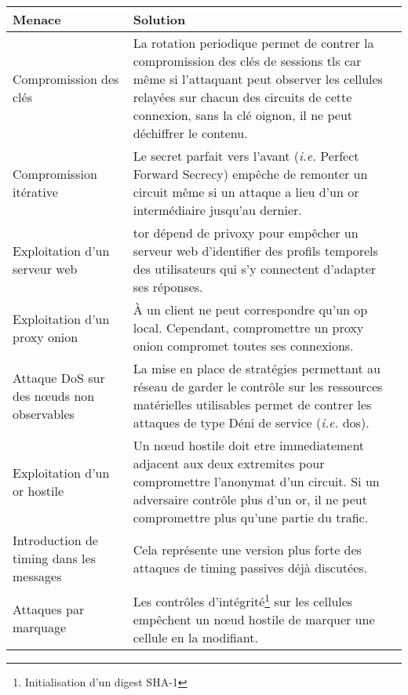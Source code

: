 \begin{table}[htpb]
    \centering
    \begin{tabularx}{\textwidth}{
        >{\raggedright\arraybackslash}p{4.5cm}
        >{\raggedright\arraybackslash}X}
    \toprule
    \rowcolor[HTML]{EFEFEF}
    \textbf{Menace}                                         & \textbf{Solution} \\
    \midrule
    Compromission des clés                                  & La rotation periodique permet de contrer la compromission des clés de sessions \acrshort{tls} car même si l'attaquant peut observer les cellules relayées sur chacun des circuits de cette connexion, sans la clé oignon, il ne peut déchiffrer le contenu. \\ 
    \midrule
    Compromission itérative                                 & Le secret parfait vers l'avant (\textit{i.e.} Perfect Forward Secrecy) empêche de remonter un circuit même si un attaque a lieu d'un \acrshort{or} intermédiaire jusqu'au dernier. \\ 
    \midrule
    Exploitation d'un serveur web                           & \acrshort{tor} dépend de \gls{privoxy} pour empêcher un serveur web d'identifier des profils temporels des utilisateurs qui s'y connectent d'adapter ses réponses. \\
    \midrule
    Exploitation d'un proxy onion                           & À un client ne peut correspondre qu'un \acrshort{op} local. Cependant, compromettre un proxy onion compromet toutes ses connexions. \\ 
    \midrule
    Attaque DoS sur des nœuds non observables               & La mise en place de stratégies permettant au réseau de garder le contrôle sur les ressources matérielles utilisables permet de contrer les attaques de type Déni de service (\textit{i.e.} \acrfull{dos}). \\
    \midrule
    Exploitation d'un \acrshort{or} hostile                 & Un nœud hostile doit etre immediatement adjacent aux deux extremites pour compromettre l'anonymat d'un circuit. Si un adversaire contrôle plus d'un \acrshort{or}, il ne peut compromettre plus qu'une partie du trafic. \\ 
    \midrule
    Introduction de timing dans les messages                & Cela représente une version plus forte des attaques de timing passives déjà discutées. \\ 
    \midrule
    Attaques par marquage                                   & Les contrôles d'intégrité\footnote{Initialisation d'un digest SHA-1} sur les cellules empêchent un n\oe ud hostile de marquer une cellule en la modifiant. \\ 

\end{tabularx}
\end{table}

